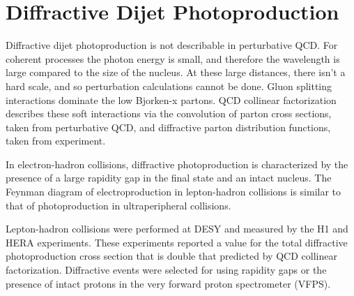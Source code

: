 
\chapter{Diffractive Dijet Photoproduction}

Diffractive dijet photoproduction is not describable in perturbative QCD. For coherent processes the photon energy is small, and therefore the wavelength is large compared to the size of the nucleus. At these large distances, there isn't a hard scale, and so perturbation calculations cannot be done. Gluon splitting interactions dominate the low Bjorken-x partons. QCD collinear factorization describes these soft interactions via the convolution of parton cross sections, taken from perturbative QCD, and diffractive parton distribution functions, taken from experiment. 

In electron-hadron collisions, diffractive photoproduction is characterized by the presence of a large rapidity gap in the final state and an intact nucleus. The Feynman diagram of electroproduction in lepton-hadron collisions is similar to that of photoproduction in ultraperipheral collisions.

Lepton-hadron collisions were performed at DESY and measured by the H1 and HERA experiments. These experiments reported a value for the total diffractive photoproduction cross section that is double that predicted by QCD collinear factorization. Diffractive events were selected for using rapidity gaps or the presence of intact protons in the very forward proton spectrometer (VFPS). 



